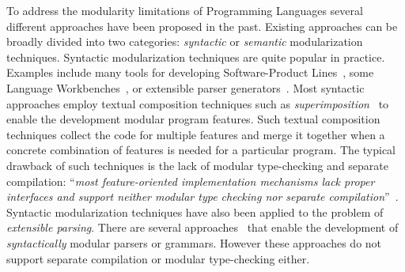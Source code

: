 \begin{comment}
Most programming languages share alot of features in
common. 

For example, most languages have language constructs for:
binding (such as variables, functions, and function applications);
basic arithmetic operations; basic logic and conditional operations;
loops; as well as various other features. For each language construct,
various operations (such as evaluation, compilation, or parsing) need
to be implemented. It is reasonable to wonder whether we can simply
implement those features independently of a particular implementation
of a programming language. Evaluation could be defined independently 
for binding and arithmetic constructs. If the language to be
implemented is the pure lambda calculus, only evaluation of binding 
constructs is necessary. Thus only the component that implements 
evaluation for binding needs to be used in such an implementation.
However, more realistic programming languages 
will include arithmetic constructs, and will require an evaluation
function for those. 


Then it would be possible to \emph{reuse}
some of those features in \emph{multiple} different implementations of
programming languages. Essentially, this would enable a SPL for
programming languages, where all

A solution to the Expression Problem could ena



A concrete 
example that illustrates this issue is 
\end{comment}

To address the modularity limitations of Programming Languages several
different approaches have been proposed in the past. Existing
approaches can be broadly divided into two categories:
\emph{syntactic} or \emph{semantic} modularization
techniques. Syntactic modularization techniques are quite popular in
practice. Examples include many tools for developing Software-Product
Lines~\cite{}, some Language Workbenches~\cite{}, or extensible parser
generators~\cite{}.  Most syntactic approaches employ textual
composition techniques such as \emph{superimposition}~\cite{} to
enable the development modular program features. Such textual
composition techniques collect the code for multiple features and
merge it together when a concrete combination of features is needed
for a particular program. The typical drawback of such techniques is
the lack of modular type-checking and separate compilation:
``\emph{most feature-oriented implementation mechanisms lack proper
  interfaces and support neither modular type checking nor separate
  compilation}''~\cite{kastner11road}. Syntactic modularization techniques have also
been applied to the problem of \emph{extensible parsing}. There are
several approaches~\cite{} that enable the development of
\emph{syntactically} modular parsers or grammars. However these
approaches do not support separate compilation or modular
type-checking either.

